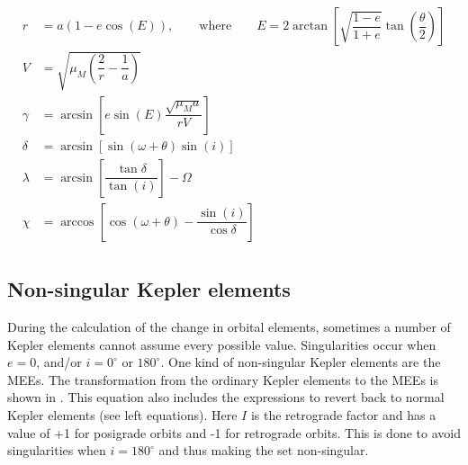 \begin{equation} \label{eq:kepltospher}
\begin{split}
r&= a\left(1-e\cos\left(E\right)\right), \qquad \text{where} \qquad E=2\arctan\left[\sqrt{\dfrac{1-e}{1+e}}\tan\left(\dfrac{\theta}{2}\right)\right]\\
V&=\sqrt{\mu_{M}\left(\dfrac{2}{r}-\dfrac{1}{a}\right)}\\
\gamma&=\arcsin\left[e\sin\left(E\right)\dfrac{\sqrt{\mu_{M}a}}{rV}\right]\\
\delta&=\arcsin\left[\sin\left(\omega+\theta\right)\sin\left(i\right)\right]\\
\lambda&=\arcsin\left[\dfrac{\tan\delta }{\tan\left(i\right)}\right]-\Omega\\
\chi&=\arccos\left[\cos\left(\omega+\theta\right)-\dfrac{\sin\left(i\right)}{\cos\delta }\right]\\
\end{split}
\end{equation} 


\subsection{Non-singular Kepler elements}
\label{subsec:nosingkep}
During the calculation of the change in orbital elements, sometimes a number of Kepler elements cannot assume every possible value. Singularities occur when $e=0$, and/or $i=0^{\circ}$ or $180^{\circ}$. One kind of non-singular Kepler elements are the \ac{MEE}s. The transformation from the ordinary Kepler elements to the \ac{MEE}s is shown in . This equation also includes the expressions to revert back to normal Kepler elements (see left equations). Here  $I$ is the retrograde factor and has a value of +1 for posigrade orbits and -1 for retrograde orbits. This is done to avoid singularities when $i=180^{\circ}$ and thus making the set non-singular. 




